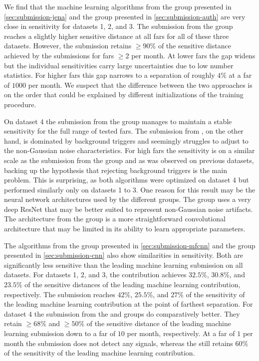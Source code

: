 We find that the machine learning algorithms from the \jena group presented in \autoref{sec:submission-jena} and the \virgo group presented in \autoref{sec:submission-auth} are very close in sensitivity for datasets 1, 2, and 3. The submission from the \jena group reaches a slightly higher sensitive distance at all \acrshort{far}s for all of these three datasets. However, the \virgo submission retains $\geq 90\%$ of the sensitive distance achieved by the \jena submissions for \acrshort{far}s $\geq2$ per month. At lower \acrshort{far}s the gap widens but the individual sensitivities carry large uncertainties due to low number statistics. For higher \acrshort{far}s this gap narrows to a separation of roughly $4\%$ at a \acrshort{far} of $1000$ per month. We suspect that the difference between the two approaches is on the order that could be explained by different initializations of the training procedure.

On dataset 4 the submission from the \virgo group manages to maintain a stable sensitivity for the full range of tested \acrshort{far}s. The submission from \jena, on the other hand, is dominated by background triggers and seemingly struggles to adjust to the non-Gaussian noise characteristics. For high \acrshort{far}s the sensitivity is on a similar scale as the submission from the \virgo group and as was observed on previous datasets, backing up the hypothesis that rejecting background triggers is the main problem. This is surprising, as both algorithms were optimized on dataset 4 but performed similarly only on datasets 1 to 3. One reason for this result may be the neural network architectures used by the different groups. The \virgo group uses a very deep ResNet that may be better suited to represent non-Gaussian noise artifacts. The architecture from the \jena group is a more straightforward convolutional architecture that may be limited in its ability to learn appropriate parameters.

The algorithms from the \mfcnn group presented in \autoref{sec:submission-mfcnn} and the \cnn group presented in \autoref{sec:submission-cnn} also show similarities in sensitivity. Both are significantly less sensitive than the leading machine learning submission on all datasets. For datasets 1, 2, and 3, the \mfcnn contribution achieves $32.5\%$, $30.8\%$, and $23.5\%$ of the sensitive distances of the leading machine learning contribution, respectively. The \cnn submission reaches $42\%$, $25.5\%$, and $27\%$ of the sensitivity of the leading machine learning contribution at the point of farthest separation. For dataset 4 the submission from the \mfcnn and \cnn groups do comparatively better. They retain $\geq 68\%$ and $\geq 50\%$ of the sensitive distance of the leading machine learning submission down to a \acrshort{far} of $10$ per month, respectively. At a \acrshort{far} of $1$ per month the \cnn submission does not detect any signals, whereas the \mfcnn still retains $60\%$ of the sensitivity of the leading machine learning contribution.

